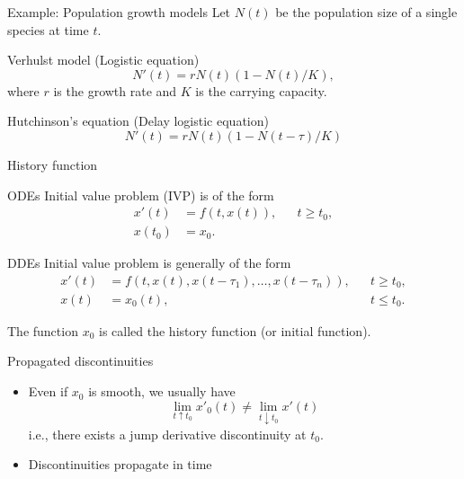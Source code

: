 \documentclass[aspectratio=169]{beamer}
\begin{document}
\begin{frame}{Example: Population growth models}
  Let $N(t)$ be the population size of a single species at time $t$.

  \pause

  \begin{block}{Verhulst model (Logistic equation)}
    \begin{equation*}
      N'(t) = r N(t) (1 - N(t) / K),
    \end{equation*}
    where $r$ is the growth rate and $K$ is the carrying capacity.
  \end{block}

  \pause

  \begin{block}{Hutchinson's equation \parencite{hutchinson48_circul_causal_system_in_ecolog} (Delay logistic equation)}
    \begin{equation*}
      N'(t) = r N(t) (1 - N(t-\tau) / K)
    \end{equation*}
  \end{block}
\end{frame}

\begin{frame}{History function}
  \begin{block}{ODEs}
    Initial value problem (IVP) is of the form
    \begin{align*}
      x'(t) &= f(t, x(t)), && t \geq t_0,\\
      x(t_0) &= x_0.
    \end{align*}
  \end{block}

  \pause

  \begin{block}{DDEs}
    Initial value problem is generally of the form
    \begin{align*}
      x'(t) &= f(t, x(t), x(t - \tau_1), \ldots, x(t - \tau_n)), && t \geq t_0,\\
      x(t) &= x_0(t), && t \leq t_0.
    \end{align*}

    The function $x_0$ is called the \alert{history function} (or initial function).
  \end{block}
\end{frame}

\begin{frame}{Propagated discontinuities}
  \begin{itemize}[<+->]
  \item Even if $x_0$ is smooth, we usually have
    \begin{equation*}
      \lim_{t \uparrow t_0} x'_0(t) \neq \lim_{t \downarrow t_0} x'(t)
    \end{equation*}
    i.e., there exists a jump derivative discontinuity at $t_0$.

  \item Discontinuities propagate in time \parencite[see, e.g.,][]{Bellen_2003}
  \end{itemize}
\end{frame}
\end{document}
